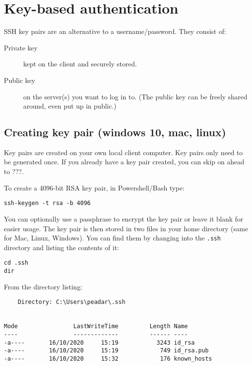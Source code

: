\documentclass{pgnotes}
\begin{document}
\section{Key-based authentication}
\label{key-based-authentication}

SSH key pairs are an alternative to a username/password. They consist
of:

\begin{description}
\item[Private key]
kept on the client and securely stored.
\item[Public key]
on the server(s) you want to log in to. (The public key can be freely
shared around, even put up in public.)
\end{description}

\subsection{Creating key pair (windows 10, mac, linux)}
\label{sec:creating-key-pair}

Key pairs are created on your own local client computer.
Key pairs only need to be generated once.
If you already have a key pair created, you can skip on ahead to ???.

To create a 4096-bit RSA key pair, in Powershell/Bash type:

\begin{verbatim}
ssh-keygen -t rsa -b 4096
\end{verbatim}

You can optionally use a passphrase to encrypt the key pair or leave it blank for easier usage.
The key pair is then stored in two files in your home directory (same for Mac, Linux, Windows).
You can find them by changing into the \texttt{.ssh} directory and listing the contents of it:

\begin{verbatim}
cd .ssh
dir
\end{verbatim}

From the directory listing:

\begin{verbatim}
    Directory: C:\Users\peadar\.ssh


Mode                LastWriteTime         Length Name
----                -------------         ------ ----
-a----       16/10/2020     15:19           3243 id_rsa
-a----       16/10/2020     15:19            749 id_rsa.pub
-a----       16/10/2020     15:32            176 known_hosts
\end{verbatim}
\end{document}
